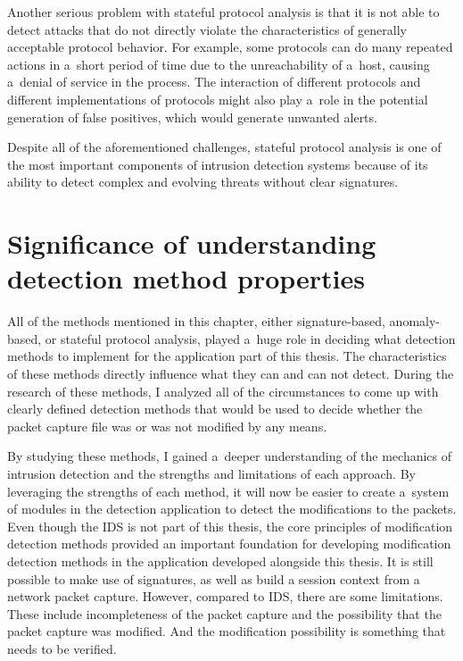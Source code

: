 \documentclass[
  printed,     %
  color,       %
  oneside,     %
  nosansbold,  %
  nocolorbold, %
  nolof,         %
  nolot,         %
]{fithesis4}
\begin{document}
Another serious problem with stateful protocol analysis is that it is not able to detect attacks that do not directly violate the characteristics of generally acceptable protocol behavior. For example, some protocols can do many repeated actions in a~short period of time due to the unreachability of a~host, causing a~denial of service in the process. The interaction of different protocols and different implementations of protocols might also play a~role in the potential generation of false positives, which would generate unwanted alerts.

Despite all of the aforementioned challenges, stateful protocol analysis is one of the most important components of intrusion detection systems because of its ability to detect complex and evolving threats without clear signatures.

\section{Significance of understanding detection method properties}

All of the methods mentioned in this chapter, either signature-based, anomaly-based, or stateful protocol analysis, played a~huge role in deciding what detection methods to implement for the application part of this thesis. The characteristics of these methods directly influence what they can and can not detect. During the research of these methods, I analyzed all of the circumstances to come up with clearly defined detection methods that would be used to decide whether the packet capture file was or was not modified by any means.

By studying these methods, I gained a~deeper understanding of the mechanics of intrusion detection and the strengths and limitations of each approach. By leveraging the strengths of each method, it will now be easier to create a~system of modules in the detection application to detect the modifications to the packets. Even though the IDS is not part of this thesis, the core principles of modification detection methods provided an important foundation for developing modification detection methods in the application developed alongside this thesis. It is still possible to make use of signatures, as well as build a session context from a network packet capture. However, compared to IDS, there are some limitations. These include incompleteness of the packet capture and the possibility that the packet capture was modified. And the modification possibility is something that needs to be verified.
\end{document}
